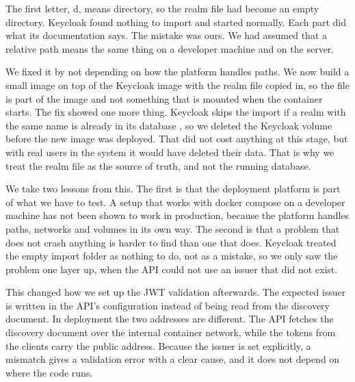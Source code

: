 The first letter, d, means directory, so the realm file had become an empty
directory. Keycloak found nothing to import and started normally. Each part did what
its documentation says. The mistake was ours. We had assumed that a relative path
means the same thing on a developer machine and on the server.

We fixed it by not depending on how the platform handles paths. We now build a small
image on top of the Keycloak image with the realm file copied in, so the file is part
of the image and not something that is mounted when the container starts. The fix
showed one more thing. Keycloak skips the import if a realm with the same name is
already in its database \cite{keycloak-import-export}, so we deleted the Keycloak
volume before the new image was deployed. That did not cost anything at this stage,
but with real users in the system it would have deleted their data. That is why we
treat the realm file as the source of truth, and not the running database.

We take two lessons from this. The first is that the deployment platform is part of
what we have to test. A setup that works with docker compose on a developer machine
has not been shown to work in production, because the platform handles paths,
networks and volumes in its own way. The second is that a problem that does not
crash anything is harder to find than one that does. Keycloak treated the empty
import folder as nothing to do, not as a mistake, so we only saw the problem one
layer up, when the API could not use an issuer that did not exist.

This changed how we set up the JWT validation afterwards. The expected issuer is
written in the API's configuration instead of being read from the discovery
document. In deployment the two addresses are different. The API fetches the
discovery document over the internal container network, while the tokens from the
clients carry the public address. Because the issuer is set explicitly, a mismatch
gives a validation error with a clear cause, and it does not depend on where the
code runs.
